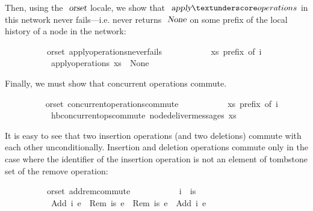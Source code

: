 \noindent Then, using the $\isa{orset}$ locale, we show that
$\isa{apply}{\isacharunderscore}operations$ in this network never fails---i.e.
never returns $\isa{None}$ on some prefix of the local history of a node in the
network:
\vspace{0.35em}
\begin{isabellebody}
\ \ \ \ \ \ \ \ \ {\isacharparenleft}\ orset{\isacharparenright}\ apply{\isacharunderscore}operations{\isacharunderscore}never{\isacharunderscore}fails{\isacharcolon}\isanewline
\ \ \ \ \ \ \ \ \ \ \ {\isachardoublequoteopen}xs\ prefix\ of\ i{\isachardoublequoteclose}\isanewline
\ \ \ \ \ \ \ \ \ \ \ {\isachardoublequoteopen}apply{\isacharunderscore}operations\ xs\ {\isasymnoteq}\ None{\isachardoublequoteclose}
\end{isabellebody}
\vspace{0.35em}
\noindent Finally, we must show that concurrent operations commute.
\vspace{0.35em}
\begin{isabellebody}
\ \ \ \ \ \ \ \  {\isacharparenleft}\ orset{\isacharparenright}\ concurrent{\isacharunderscore}operations{\isacharunderscore}commute{\isacharcolon}\isanewline
\ \ \ \ \ \ \ \ \ \ \ {\isachardoublequoteopen}xs\ prefix\ of\ i{\isachardoublequoteclose}\isanewline
\ \ \ \ \ \ \ \ \ \ \ {\isachardoublequoteopen}hb{\isachardot}concurrent{\isacharunderscore}ops{\isacharunderscore}commute\ {\isacharparenleft}node{\isacharunderscore}deliver{\isacharunderscore}messages\ xs{\isacharparenright}{\isachardoublequoteclose}
\end{isabellebody}
\vspace{0.35em}
\noindent It is easy to see that two insertion operations (and two deletions)
commute with each other unconditionally. Insertion and deletion operations
commute only in the case where the identifier of the insertion operation is not
an element of tombstone set of the remove operation:
\vspace{0.35em}
\begin{isabellebody}
\ \ \ \ \ \ \ \ \ {\isacharparenleft}\ orset{\isacharparenright}\ add{\isacharunderscore}rem{\isacharunderscore}commute{\isacharcolon}\isanewline
\ \ \ \ \ \ \ \ \ \ \ {\isachardoublequoteopen}i\ {\isasymnotin}\ is{\isachardoublequoteclose}\isanewline
\ \ \ \ \ \ \ \ \ \ \ {\isachardoublequoteopen}{\isasymlangle}Add\ i\ e{}{\isasymrangle}\ {\isasymrhd}\ {\isasymlangle}Rem\ is\ e{}{\isasymrangle}\ {\isacharequal}\ {\isasymlangle}Rem\ is\ e{}{\isasymrangle}\ {\isasymrhd}\ {\isasymlangle}Add\ i\ e{}{\isasymrangle}{\isachardoublequoteclose}
\end{isabellebody}
\vspace{0.35em}

